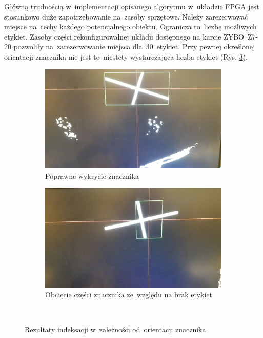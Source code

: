 Główną trudnością w~implementacji opisanego algorytmu w~układzie FPGA jest stosunkowo duże zapotrzebowanie na~zasoby sprzętowe. 
Należy zarezerwować miejsce na~cechy każdego potencjalnego obiektu. 
Ogranicza to~liczbę możliwych etykiet. 
Zasoby części rekonfigurowalnej układu dostępnego na karcie ZYBO~Z7-20 pozwoliły na~zarezerwowanie miejsca dla~30~etykiet. 
Przy pewnej określonej orientacji znacznika nie jest to~niestety wystarczająca liczba etykiet (Rys. \ref{fig:rezultaty_ind}). %
\begin{figure}
	\centering
	\begin{subfigure}{0.45\textwidth}
		\centering
		\includegraphics[width=\textwidth]{ind_poprawna.jpg}
		\caption{Poprawne wykrycie znacznika}
		\label{fig:ind_poprawna}
	\end{subfigure}
	\begin{subfigure}{0.45\textwidth}
		\centering
		\includegraphics[width=\textwidth]{ind_niepoprawna.jpg}
		\caption{Obcięcie części znacznika ze~względu na brak etykiet}
		\label{fig:ind_niepoprawna}
	\end{subfigure}\\
	\caption{Rezultaty indeksacji w~zależności od~orientacji znacznika}
	\label{fig:rezultaty_ind}
\end{figure}
